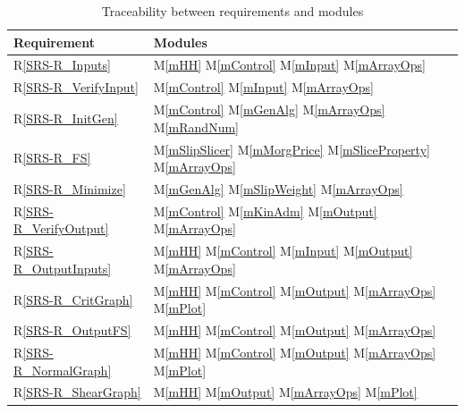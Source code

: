 \documentclass[12pt, titlepage]{article}
\newcommand{\rref}[1]{R\ref{#1}}
\newcommand{\mref}[1]{M\ref{#1}}
\begin{document}
\begin{table}[h!]
\centering
\begin{tabular}{ll}
\toprule
\textbf{Requirement} & \textbf{Modules}\\
\midrule
\rref{SRS-R_Inputs} & \mref{mHH} \mref{mControl} \mref{mInput} 
\mref{mArrayOps}\\
\rref{SRS-R_VerifyInput} & \mref{mControl} \mref{mInput} \mref{mArrayOps}\\
\rref{SRS-R_InitGen} & \mref{mControl} \mref{mGenAlg} \mref{mArrayOps} 
\mref{mRandNum} \\
\rref{SRS-R_FS} & \mref{mSlipSlicer} \mref{mMorgPrice} \mref{mSliceProperty} 
\mref{mArrayOps}\\
\rref{SRS-R_Minimize} & \mref{mGenAlg} \mref{mSlipWeight} \mref{mArrayOps}\\
\rref{SRS-R_VerifyOutput} & \mref{mControl} \mref{mKinAdm} \mref{mOutput} 
\mref{mArrayOps}\\
\rref{SRS-R_OutputInputs} & \mref{mHH} \mref{mControl} \mref{mInput} 
\mref{mOutput} \mref{mArrayOps}\\
\rref{SRS-R_CritGraph} & \mref{mHH} \mref{mControl} \mref{mOutput} 
\mref{mArrayOps} \mref{mPlot}\\
\rref{SRS-R_OutputFS} & \mref{mHH} \mref{mControl} \mref{mOutput} 
\mref{mArrayOps}\\
\rref{SRS-R_NormalGraph} & \mref{mHH} \mref{mControl} \mref{mOutput} 
\mref{mArrayOps} \mref{mPlot}\\
\rref{SRS-R_ShearGraph} & \mref{mHH} \mref{mOutput} \mref{mArrayOps} 
\mref{mPlot}\\
\bottomrule
\end{tabular}
\caption{Traceability between requirements and modules}
\label{Table:Req}
\end{table}
\end{document}
